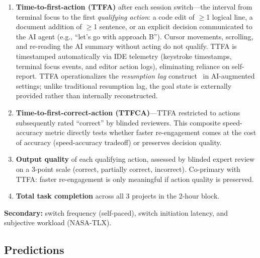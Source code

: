 \documentclass[sigconf,nonacm]{acmart}
\begin{document}
\begin{enumerate}
\item \textbf{Time-to-first-action (TTFA)} after each session switch---the interval from terminal focus to the first \emph{qualifying action}: a code edit of $\geq$1 logical line, a document addition of $\geq$1 sentence, or an explicit decision communicated to the AI agent (e.g., ``let's go with approach B''). Cursor movements, scrolling, and re-reading the AI summary without acting do not qualify. TTFA is timestamped automatically via IDE telemetry (keystroke timestamps, terminal focus events, and editor action logs), eliminating reliance on self-report. TTFA operationalizes the \emph{resumption lag} construct~\cite{altmann2002} in AI-augmented settings; unlike traditional resumption lag, the goal state is externally provided rather than internally reconstructed.

\item \textbf{Time-to-first-correct-action (TTFCA)}---TTFA restricted to actions subsequently rated ``correct'' by blinded reviewers. This composite speed-accuracy metric directly tests whether faster re-engagement comes at the cost of accuracy (speed-accuracy tradeoff) or preserves decision quality.

\item \textbf{Output quality} of each qualifying action, assessed by blinded expert review on a 3-point scale (correct, partially correct, incorrect). Co-primary with TTFA: faster re-engagement is only meaningful if action quality is preserved.

\item \textbf{Total task completion} across all 3 projects in the 2-hour block.
\end{enumerate}

\textbf{Secondary:} switch frequency (self-paced), switch initiation latency, and subjective workload (NASA-TLX).

\subsection{Predictions}
\end{document}

